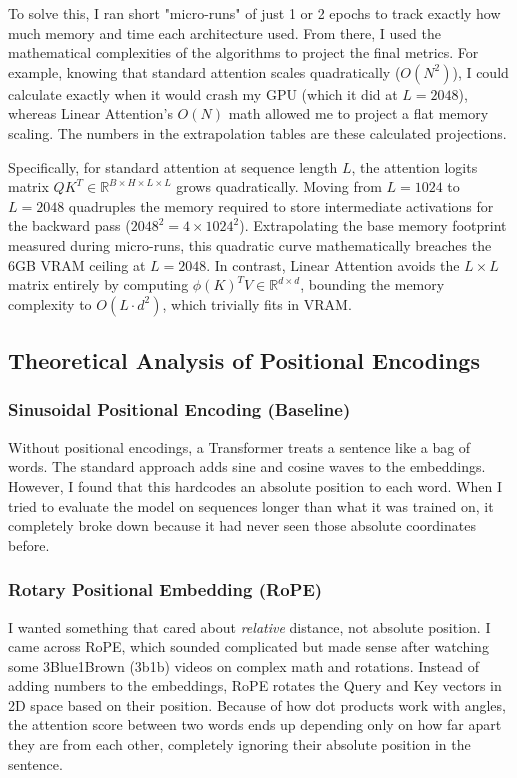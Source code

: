 \documentclass[11pt,a4paper]{article}
\begin{document}
To solve this, I ran short "micro-runs" of just 1 or 2 epochs to track exactly how much memory and time each architecture used. From there, I used the mathematical complexities of the algorithms to project the final metrics. For example, knowing that standard attention scales quadratically ($O(N^2)$), I could calculate exactly when it would crash my GPU (which it did at $L=2048$), whereas Linear Attention's $O(N)$ math allowed me to project a flat memory scaling. The numbers in the extrapolation tables are these calculated projections.

Specifically, for standard attention at sequence length $L$, the attention logits matrix $Q K^T \in \mathbb{R}^{B \times H \times L \times L}$ grows quadratically. Moving from $L=1024$ to $L=2048$ quadruples the memory required to store intermediate activations for the backward pass ($2048^2 = 4 \times 1024^2$). Extrapolating the base memory footprint measured during micro-runs, this quadratic curve mathematically breaches the 6GB VRAM ceiling at $L=2048$. In contrast, Linear Attention avoids the $L \times L$ matrix entirely by computing $\phi(K)^T V \in \mathbb{R}^{d \times d}$, bounding the memory complexity to $O(L \cdot d^2)$, which trivially fits in VRAM.

\subsection{Theoretical Analysis of Positional Encodings}

\subsubsection{Sinusoidal Positional Encoding (Baseline)}
Without positional encodings, a Transformer treats a sentence like a bag of words. The standard approach adds sine and cosine waves to the embeddings. However, I found that this hardcodes an absolute position to each word. When I tried to evaluate the model on sequences longer than what it was trained on, it completely broke down because it had never seen those absolute coordinates before.

\subsubsection{Rotary Positional Embedding (RoPE)}
I wanted something that cared about \emph{relative} distance, not absolute position. I came across RoPE, which sounded complicated but made sense after watching some 3Blue1Brown (3b1b) videos on complex math and rotations. Instead of adding numbers to the embeddings, RoPE rotates the Query and Key vectors in 2D space based on their position. Because of how dot products work with angles, the attention score between two words ends up depending only on how far apart they are from each other, completely ignoring their absolute position in the sentence.
\end{document}
